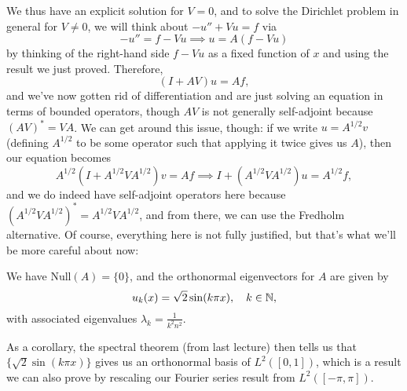 We thus have an explicit solution for $V = 0$, and to solve the Dirichlet problem in general for $V \ne 0$, we will think about $-u'' + Vu = f$ via
\[
    -u'' = f - Vu \implies u = A(f - Vu)
\]
by thinking of the right-hand side $f - Vu$ as a fixed function of $x$ and using the result we just proved. Therefore, 
\[
    (I + AV)u = Af,
\]
and we've now gotten rid of differentiation and are just solving an equation in terms of bounded operators, though $AV$ is not generally self-adjoint because $(AV)^\ast = VA$. We can get around this issue, though: if we write $u = A^{1/2} v$ (defining $A^{1/2}$ to be some operator such that applying it twice gives us $A$), then our equation becomes 
\[
    A^{1/2}(I + A^{1/2} VA^{1/2})v = Af \implies I + (A^{1/2} V A^{1/2})u = A^{1/2} f,
\]
and we do indeed have self-adjoint operators here because $(A^{1/2}VA^{1/2})^\ast = A^{1/2}VA^{1/2}$, and from there, we can use the Fredholm alternative. Of course, everything here is not fully justified, but that's what we'll be more careful about now:

\begin{theorem}
We have $\text{Null}(A) = \{0\}$, and the orthonormal eigenvectors for $A$ are given by 
\[
    u_k(x) = \sqrt{2} \sin(k \pi x), \quad k \in \mathbb N,
\]
with associated eigenvalues $\lambda_k = \frac{1}{k^2n^2}$. 
\end{theorem}

\begin{remark}
As a corollary, the spectral theorem (from last lecture) then tells us that $\{\sqrt{2} \sin(k \pi x)\}$ gives us an orthonormal basis of $L^2([0, 1])$, which is a result we can also prove by rescaling our Fourier series result from $L^2([-\pi, \pi])$.
\end{remark}

